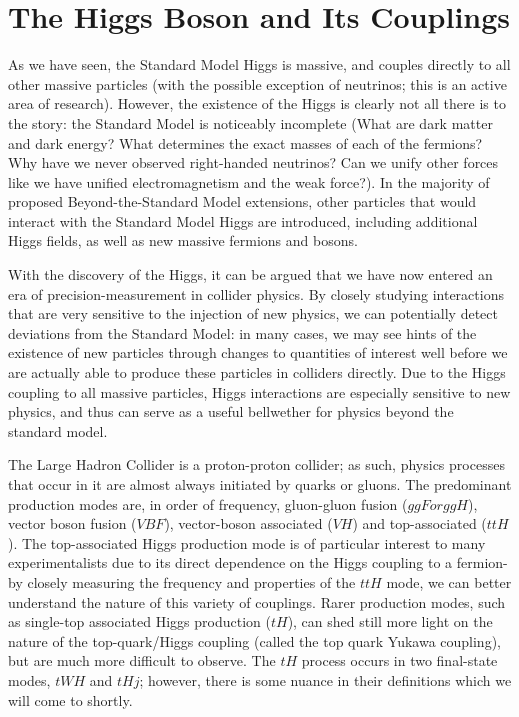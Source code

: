 \section{The Higgs Boson and Its Couplings} \label{sec:Higgs Couplings} 

As we have seen, the Standard Model Higgs is massive, and couples directly to all other massive particles (with the possible exception of neutrinos; this is an active area of research). However, the existence of the Higgs is clearly not all there is to the story: the Standard Model is noticeably incomplete (What are dark matter and dark energy? What determines the exact masses of each of the fermions? Why have we never observed right-handed neutrinos? Can we unify other forces like we have unified electromagnetism and the weak force?). In the majority of proposed Beyond-the-Standard Model extensions, other particles that would interact with the Standard Model Higgs are introduced, including additional Higgs fields, as well as new massive fermions and bosons.

With the discovery of the Higgs, it can be argued that we have now entered an era of precision-measurement in collider physics. By closely studying interactions that are very sensitive to the injection of new physics, we can potentially detect deviations from the Standard Model: in many cases, we may see hints of the existence of new particles through changes to quantities of interest well before we are actually able to produce these particles in colliders directly. Due to the Higgs coupling to all massive particles, Higgs interactions are especially sensitive to new physics, and thus can serve as a useful bellwether for physics beyond the standard model.

The Large Hadron Collider is a proton-proton collider; as such, physics processes that occur in it are almost always initiated by quarks or gluons. The predominant production modes are, in order of frequency, gluon-gluon fusion ($ggF or ggH$), vector boson fusion ($VBF$), vector-boson associated ($VH$) and top-associated ($ttH$). The top-associated Higgs production mode is of particular interest to many experimentalists due to its direct dependence on the Higgs coupling to a fermion- by closely measuring the frequency and properties of the $ttH$ mode, we can better understand the nature of this variety of couplings. Rarer production modes, such as single-top associated Higgs production ($tH$), can shed still more light on the nature of the top-quark/Higgs coupling (called the top quark Yukawa coupling), but are much more difficult to observe. The $tH$ process occurs in two final-state modes, $tWH$ and $tHj$; however, there is some nuance in their definitions which we will come to shortly.

